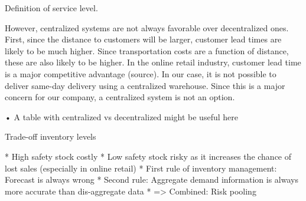 \documentclass[../../main.tex]{subfiles}
\begin{document}
Definition of service level.

However, centralized systems are not always favorable over decentralized ones. First, since the distance to customers will be larger, customer lead times are likely to be much higher. Since transportation costs are a function of distance, these are also likely to be higher. In the online retail industry, customer lead time is a major competitive advantage (source). In our case, it is not possible to deliver same-day delivery using a centralized warehouse. Since this is a major concern for our company, a centralized system is not an option.

•	A table with centralized vs decentralized might be useful here

Trade-off inventory levels

*	High safety stock costly
*	Low safety stock risky as it increases the chance of lost sales (especially in online retail)
*	First rule of inventory management: Forecast is always wrong
*	Second rule: Aggregate demand information is always more accurate than dis-aggregate data
*	=> Combined: Risk pooling

\end{document}
